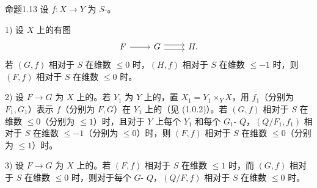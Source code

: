 \begin{SGAresult}{命题}{1.13}
设 $f:X\to Y$ 为 $S$-。

1) 设 $X$ 上的有图
\[
\begin{tikzcd}
F\arrow[r]&G\arrow[r,shift left=.6ex]\arrow[r,shift right=.6ex]&H.
\end{tikzcd}
\]
若 $(G,f)$ 相对于 $S$ 在维数 $\leqslant0$ 时，$(H,f)$ 相对于 $S$ 在维数 $\leqslant-1$ 时，则 $(F,f)$ 相对于 $S$ 在维数 $\leqslant0$ 时。

2) 设 $F\to G$ 为 $X$ 上的。若 $Y_1$ 为 $Y$ 上的，置 $X_1=Y_1\times_Y X$，用 $f_1$（分别为 $F_1,G_1$）表示 $f$（分别为 $F,G$）在 $Y_1$ 上的（见 (1.0.2)）。若 $(G,f)$ 相对于 $S$ 在维数 $\leqslant0$（分别为 $\leqslant1$）时，且对于 $Y$ 上每个 $Y_1$ 和每个 $G_1$- $Q$，$(Q/F_1,f_1)$ 相对于 $S$ 在维数 $\leqslant-1$（分别为 $\leqslant0$）时，则 $(F,f)$ 相对于 $S$ 在维数 $\leqslant0$（分别为 $\leqslant1$）时。

3) 设 $F\to G$ 为 $X$ 上的。若 $(F,f)$ 相对于 $S$ 在维数 $\leqslant1$ 时，而 $(G,f)$ 相对于 $S$ 在维数 $\leqslant0$ 时，则对于每个 $G$- $Q$，$(Q/F,f)$ 相对于 $S$ 在维数 $\leqslant0$ 时。
\end{SGAresult}
